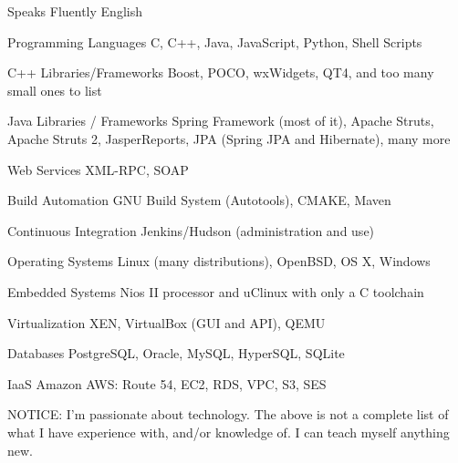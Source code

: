 Speaks Fluently
English

Programming Languages
C, C++, Java, JavaScript, Python, Shell Scripts

C++ Libraries/Frameworks
Boost, POCO, wxWidgets, QT4, and too many small ones to list

Java Libraries / Frameworks
Spring Framework (most of it), Apache Struts, Apache Struts 2, JasperReports, JPA (Spring JPA and Hibernate), many more

Web Services
XML-RPC, SOAP

Build Automation
GNU Build System (Autotools), CMAKE, Maven

Continuous Integration
Jenkins/Hudson (administration and use)

Operating Systems
Linux (many distributions), OpenBSD, OS X, Windows

Embedded Systems
Nios II processor and uClinux with only a C toolchain

Virtualization
XEN, VirtualBox (GUI and API), QEMU

Databases
PostgreSQL, Oracle, MySQL, HyperSQL, SQLite

IaaS
Amazon AWS: Route 54, EC2, RDS, VPC, S3, SES

NOTICE:
I'm passionate about technology.
The above is not a complete list of what I have experience with, and/or knowledge of.
I can teach myself anything new.
